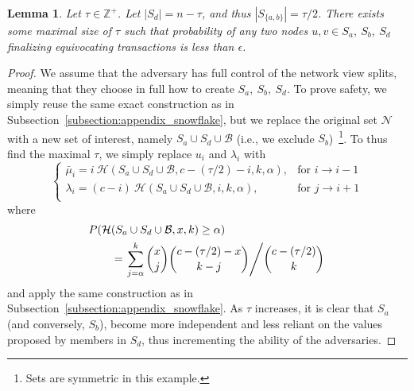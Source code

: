 \documentclass[letterpaper,twocolumn,10pt]{article}
\newtheorem{lemma}[theorem]{Lemma}
\theoremstyle{definition}
\begin{document}
\begin{appendices}
{\begin{lemma}
Let $\tau \in \mathbb{Z}^{+}$. Let $|S_d| = n - \tau$, and thus $|S_{\{a, b\}}| = \tau/2$. There exists some maximal size of $\tau$ such that probability of any two nodes $u, v \in S_a,\ S_b,\ S_d$ finalizing equivocating transactions is less than $\epsilon$. 
\end{lemma}
\begin{proof}
We assume that the adversary has full control of the network view splits, meaning that they choose in full how to create $S_a,\ S_b,\ S_d$. To prove safety, we simply reuse the same exact construction as in Subsection~\ref{subsection:appendix_snowflake}, but we replace the original set $\mathcal{N}$ with a new set of interest, namely $S_a \cup S_d \cup \mathcal{B}$ (i.e., we exclude $S_b$)~\footnote{Sets are symmetric in this example.}. To thus find the maximal $\tau$, we simply replace $u_i$ and $\lambda_i$ with 
\begin{equation}
    \begin{cases}
        \bar \mu_i = i\ \mathcal{H}(S_a \cup S_d \cup \mathcal{B}, c-(\tau/2)-i, k, \alpha), & \text{for } i \rightarrow i - 1 \\
        \lambda_i = (c-i)\ \mathcal{H}(S_a \cup S_d \cup \mathcal{B}, i, k, \alpha), & \text{for } j \rightarrow i + 1 \\
    \end{cases}
\end{equation}
where
\begin{equation}
\begin{split}
P(\mathcal{H}&(S_a \cup S_d \cup \mathcal{B}, x, k) \geq \alpha)\\
&= \left.\sum_{j = \alpha}^{k} {x \choose j}{c-(\tau/2)-x \choose k-j}\middle/{c - (\tau/2) \choose k}\right.\\
\end{split}
\end{equation}
and apply the same construction as in Subsection~\ref{subsection:appendix_snowflake}. As $\tau$ increases, it is clear that $S_a$ (and conversely, $S_b$), become more independent and less reliant on the values proposed by members in $S_d$, thus incrementing the ability of the adversaries. 
\end{proof}


}



\end{appendices}
\end{document}
